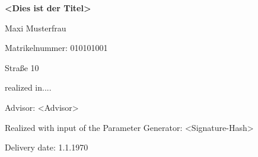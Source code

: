 \vspace*{15mm}

\begin{Large} 
\begin{center}
\textbf{<Dies ist der Titel>}
\end{center}
\end{Large}

\vspace*{15mm}

\begin{large} 
\begin{center}
Maxi Musterfrau
\end{center}
\end{large} 

\vspace*{-6mm}

\begin{large} 
\begin{center}
Matrikelnummer: 010101001
\end{center}
\end{large} 

\vspace*{-6mm}

\begin{large} 
\begin{center}
Straße 10
\end{center}
\end{large} 

\vspace*{-6mm}

\begin{large} 
\begin{center}
realized in....
\end{center}
\end{large} 

\vspace*{5mm}

\begin{large} 
\begin{center}
Advisor: <Advisor>
\end{center}
\end{large} 

\begin{large} 
\begin{center}
Realized with input of the Parameter Generator: <Signature-Hash>
\end{center}
\end{large} 



\vspace*{-6mm}

\begin{large} 
\begin{center}
Delivery date: 1.1.1970
\end{center}
\end{large} 


\pagestyle{empty} %

